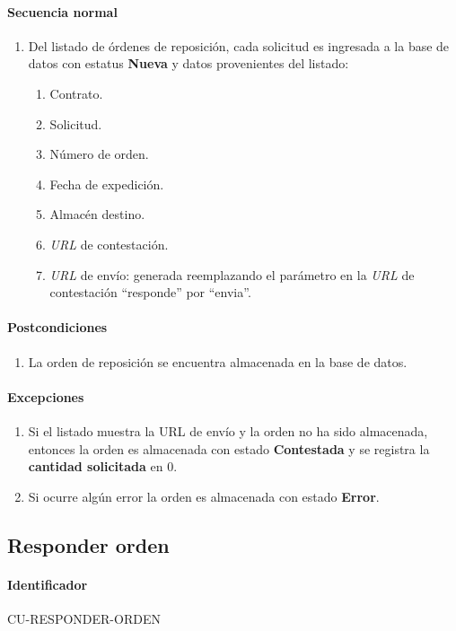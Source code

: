 \paragraph{Secuencia normal}
\begin{enumerate}
  \item Del listado de órdenes de reposición, cada solicitud es ingresada a la base de datos con estatus \textbf{Nueva} y datos provenientes del listado:
  \begin{enumerate}
    \item Contrato.
    \item Solicitud.
    \item Número de orden.
    \item Fecha de expedición.
    \item Almacén destino.
    \item \textit{URL} de contestación.
    \item \textit{URL} de envío: generada reemplazando el parámetro en la \textit{URL} de contestación ``responde'' por ``envia''.
  \end{enumerate}
\end{enumerate}
\paragraph{Postcondiciones}
\begin{enumerate}
  \item La orden de reposición se encuentra almacenada en la base de datos.
\end{enumerate}
\paragraph{Excepciones}
\begin{enumerate}
  \item Si el listado muestra la URL de envío y la orden no ha sido almacenada, entonces la orden es almacenada con estado \textbf{Contestada} y se registra la \textbf{cantidad solicitada} en 0.
  \item Si ocurre algún error la orden es almacenada con estado \textbf{Error}.
\end{enumerate}


\subsection{Responder orden}
\paragraph{Identificador}
CU-RESPONDER-ORDEN
